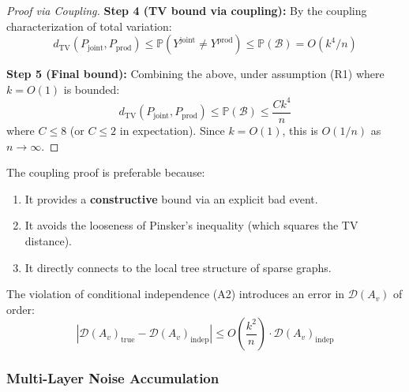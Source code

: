 \begin{proof}[Proof via Coupling]
\textbf{Step 4 (TV bound via coupling):} By the coupling characterization of total variation:
\begin{equation}
    d_{\mathrm{TV}}(P_{\mathrm{joint}}, P_{\mathrm{prod}}) \leq \mathbb{P}(Y^{\mathrm{joint}} \neq Y^{\mathrm{prod}}) \leq \mathbb{P}(\mathcal{B}) = O(k^4/n)
\end{equation}

\textbf{Step 5 (Final bound):} Combining the above, under assumption (R1) where $k = O(1)$ is bounded:
\begin{equation}
    d_{\mathrm{TV}}(P_{\mathrm{joint}}, P_{\mathrm{prod}}) \leq \mathbb{P}(\mathcal{B}) \leq \frac{C k^4}{n}
\end{equation}
where $C \leq 8$ (or $C \leq 2$ in expectation). Since $k = O(1)$, this is $O(1/n)$ as $n \to \infty$.
\end{proof}

\begin{remark}
The coupling proof is preferable because:
\begin{enumerate}
    \item It provides a \textbf{constructive} bound via an explicit bad event.
    \item It avoids the looseness of Pinsker's inequality (which squares the TV distance).
    \item It directly connects to the local tree structure of sparse graphs.
\end{enumerate}
\end{remark}

\begin{corollary}
\label{cor:A2_snr_error}
The violation of conditional independence (A2) introduces an error in $\mathcal{D}(A_v)$ of order:
\begin{equation}
    \left|\mathcal{D}(A_v)_{\mathrm{true}} - \mathcal{D}(A_v)_{\mathrm{indep}}\right| \leq O\left(\frac{k^2}{n}\right) \cdot \mathcal{D}(A_v)_{\mathrm{indep}}
\end{equation}
\end{corollary}

\subsubsection{Multi-Layer Noise Accumulation}

